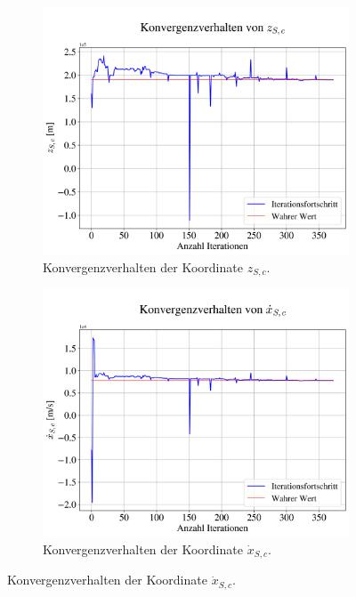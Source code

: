\documentclass[a4paper,12pt]{article}
\numberwithin{equation}{section}
\begin{document}
\begin{figure}[ht]\ContinuedFloat
	\centering
	\begin{subfigure}[t]{0.49\textwidth}
	\centering
	\includegraphics[width=\textwidth]{figures/conv_zp.png}
	\caption{Konvergenzverhalten der Koordinate $z_{S,c}$.}
	\label{fig:konvverh3zp}
	\end{subfigure}
	\hfill
	\begin{subfigure}[t]{0.49\textwidth}
	\centering
	\includegraphics[width=\textwidth]{figures/conv_xv.png}
	\caption{Konvergenzverhalten der Koordinate $\dot{x}_{S,c}$.}
	\label{fig:konvverh4xv}
	\end{subfigure}
\end{figure}
\end{document}
